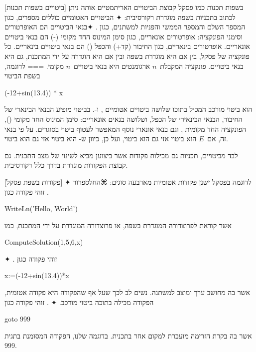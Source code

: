 [ביטויים בשפות תכנות]
  בשפות תכנות כמו פסקל קבוצת הביטויים האריתמטיים אותה ניתן לכתוב בתכניות בשפה
  מוגדרת רקורסיבית:
  ✦ הביטויים
  האטומיים כוללים מספרים, כגון המספר השלם
   והמספר הממשי
  והפניות למשתנים, כגון .
  ✦בנאי הביטויים הם האופרטורים וסימני הפונקציה:
  אופרטורים אונאריים, כגון סימן המינוס החד מקומי (-) הם בנאי ביטויים אונאריים.
  אופרטורים בינאריים, כגון החיבור (קד+) והכפל () הם בנאי
  ביטויים בינאריים. כל פונקציה של פסקל, בין אם היא מוגדרת בשפה ובין אם היא הוגדרה על ידי המתכנת, גם היא בנאי ביטויים. פונקציה המקבלת~$n$ ארגומנטים היא בנאי ביטויים~$n$ מקומי.
===
  לדוגמה, בשפת  הביטוי
  \begin{PASCAL}
(-12+sin(13.4)) * x
\end{PASCAL}
  הוא ביטוי מורכב המכיל בתוכו שלושה ביטויים אטומיים , 
  ו-. בביטוי מופיע הבנאי הבינארי של החיבור, הבנאי הבינאירי של הכפל,
  ושלושה בנאים אונאריים: סימן המינוס החד מקומי (), הפונקציה החד מקומית
  , וגם בנאי אונארי נוסף המאפשר לעטוף ביטוי בסוגרים. על פי בנאי
  זה, אם~$E$ הוא ביטוי אזי גם  הוא ביטוי, ועל כן, כיוון
  ש- הוא ביטוי אזי גם  הוא ביטוי.

לבד מביטויים, תכניות גם מכילות פקודות אשר ביצוען מביא לשינוי של מצב התכנית. גם קבוצת הפקודות מוגדרת בדרך כלל רקורסיבית.

[פקודות בשפת פסקל]
  לדוגמה בפסקל ישנן פקודות אטומיות מארבעה סוגים:
  ⌘החל{ספרור}
  ✦ . זוהי פקודה כגון
  \begin{PASCAL}
WriteLn('Hello, World')
\end{PASCAL}
  אשר קוראת לפרוצדורה המוגדרת בשפה, או פרוצדורה המוגדרת על ידי המתכנת, כמו
  \begin{PASCAL}
ComputeSolution(1,5,6,x)
\end{PASCAL}
  ✦ . זוהי פקודה כגון
  \begin{PASCAL}
x:=(-12+sin(13.4))*x
\end{PASCAL}
  אשר בה מחושב ערך ומוצב למשתנה. נשים לב לכך שעל אף שהפקודה
  היא פקודה אטומית, הפקודה מכילה בתוכה ביטוי מורכב.
  ✦ . זוהי פקודה כגון
  \begin{PASCAL}
goto 999
\end{PASCAL}
  אשר בה בקרת הזרימה מועברת למקום אחר בתכנית. בדוגמה שלנו, הפקודה המסומנת בתגית 999.

